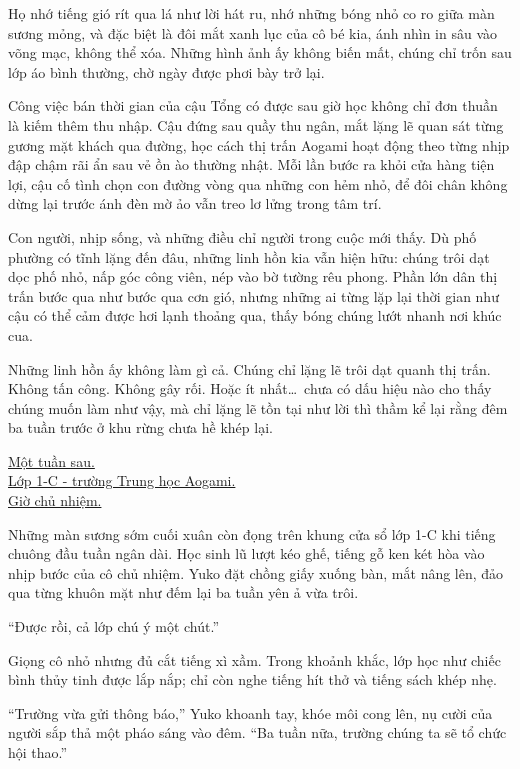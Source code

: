 \documentclass[../main.tex]{subfiles}
\begin{document}
Họ nhớ tiếng gió rít qua lá như lời hát ru, nhớ những bóng nhỏ co ro giữa màn sương mỏng, và đặc biệt là đôi mắt xanh lục của cô bé kia, ánh nhìn in sâu vào võng mạc, không thể xóa. Những hình ảnh ấy không biến mất, chúng chỉ trốn sau lớp áo bình thường, chờ ngày được phơi bày trở lại.

Công việc bán thời gian của cậu Tổng có được sau giờ học không chỉ đơn thuần là kiếm thêm thu nhập. Cậu đứng sau quầy thu ngân, mắt lặng lẽ quan sát từng gương mặt khách qua đường, học cách thị trấn Aogami hoạt động theo từng nhịp đập chậm rãi ẩn sau vẻ ồn ào thường nhật. Mỗi lần bước ra khỏi cửa hàng tiện lợi, cậu cố tình chọn con đường vòng qua những con hẻm nhỏ, để đôi chân không dừng lại trước ánh đèn mờ ảo vẫn treo lơ lửng trong tâm trí.

Con người, nhịp sống, và những điều chỉ người trong cuộc mới thấy. Dù phố phường có tĩnh lặng đến đâu, những linh hồn kia vẫn hiện hữu: chúng trôi dạt dọc phố nhỏ, nấp góc công viên, nép vào bờ tường rêu phong. Phần lớn dân thị trấn bước qua như bước qua cơn gió, nhưng những ai từng lặp lại thời gian như cậu có thể cảm được hơi lạnh thoảng qua, thấy bóng chúng lướt nhanh nơi khúc cua.

Những linh hồn ấy không làm gì cả. Chúng chỉ lặng lẽ trôi dạt quanh thị trấn. Không tấn công. Không gây rối. Hoặc ít nhất\dots\ chưa có dấu hiệu nào cho thấy chúng muốn làm như vậy, mà chỉ lặng lẽ tồn tại như lời thì thầm kể lại rằng đêm ba tuần trước ở khu rừng chưa hề khép lại.

\ct

\begin{center}
  \uline{Một tuần sau.\\Lớp 1-C - trường Trung học Aogami.\\Giờ chủ nhiệm.}
\end{center}

Những màn sương sớm cuối xuân còn đọng trên khung cửa sổ lớp 1-C khi tiếng chuông đầu tuần ngân dài. Học sinh lũ lượt kéo ghế, tiếng gỗ ken két hòa vào nhịp bước của cô chủ nhiệm. Yuko đặt chồng giấy xuống bàn, mắt nâng lên, đảo qua từng khuôn mặt như đếm lại ba tuần yên ả vừa trôi.

``Được rồi, cả lớp chú ý một chút.''

Giọng cô nhỏ nhưng đủ cắt tiếng xì xầm. Trong khoảnh khắc, lớp học như chiếc bình thủy tinh được lắp nắp; chỉ còn nghe tiếng hít thở và tiếng sách khép nhẹ.

``Trường vừa gửi thông báo,'' Yuko khoanh tay, khóe môi cong lên, nụ cười của người sắp thả một pháo sáng vào đêm. ``Ba tuần nữa, trường chúng ta sẽ tổ chức hội thao.''
\end{document}
